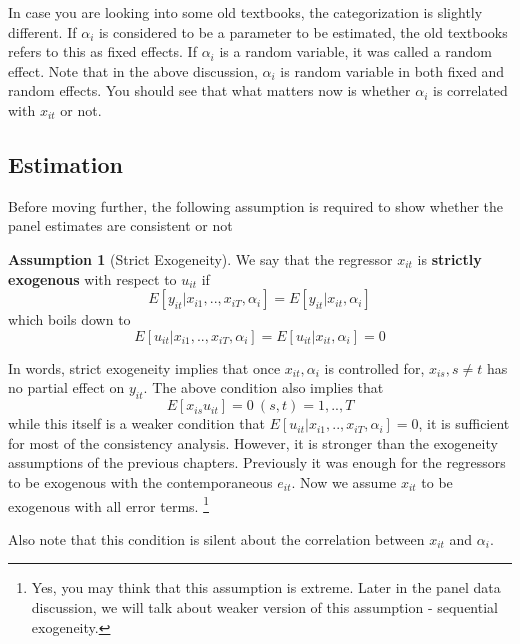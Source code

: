 \documentclass[12pt]{article}
\theoremstyle{definition}
\theoremstyle{property}
\theoremstyle{assumption}
\newtheorem{assumption}{Assumption}[section]
\theoremstyle{example}
\theoremstyle{comment}
\begin{document}
In case you are looking into some old textbooks, the categorization is slightly different. If $\alpha_i$ is considered to be a parameter to be estimated, the old textbooks refers to this as fixed effects. If $\alpha_i$ is a random variable, it was called a random effect. Note that in the above discussion, $\alpha_i$ is random variable in both fixed and random effects. You should see that what matters now is whether $\alpha_i$ is correlated with $x_{it}$ or not. \par
\subsection{Estimation}
Before moving further, the following assumption is required to show whether the panel estimates are consistent or not
\begin{mdframed}[backgroundcolor=blue!5] 
\begin{assumption}[Strict Exogeneity] We say that the regressor $x_{it}$ is \textbf{strictly exogenous} with respect to $u_{it}$ if
\[
E[y_{it}|x_{i1},..,x_{iT},\alpha_i]=E[y_{it}|x_{it},\alpha_i]
\]
which boils down to
\[
E[u_{it}|x_{i1},..,x_{iT},\alpha_i]=E[u_{it}|x_{it},\alpha_i]=0
\]
\end{assumption}
\end{mdframed} \par
In words, strict exogeneity implies that once $x_{it}, \alpha_i$ is controlled for, $x_{is}, s\neq t$ has no partial effect on $y_{it}$. The above condition also implies that 
\[
E[x_{is}u_{it}]=0 \ (s,t)=1,..,T
\]
while this itself is a weaker condition that $E[u_{it}|x_{i1},..,x_{iT},\alpha_i]=0$, it is sufficient for most of the consistency analysis. However, it is stronger than the exogeneity assumptions of the previous chapters. Previously it was enough for the regressors to be exogenous with the contemporaneous $e_{it}$. Now we assume $x_{it}$ to be exogenous with all error terms. \footnote{Yes, you may think that this assumption is extreme. Later in the panel data discussion, we will talk about weaker version of this assumption - sequential exogeneity. }\par
Also note that this condition is silent about the correlation between $x_{it}$ and $\alpha_i$. 
\end{document}
